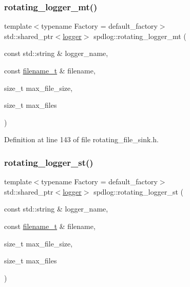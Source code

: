 \subsubsection{\texorpdfstring{rotating\+\_\+logger\+\_\+mt()}{rotating\_logger\_mt()}}
{\footnotesize\ttfamily template$<$typename Factory  = default\+\_\+factory$>$ \\
std\+::shared\+\_\+ptr$<$\hyperlink{classspdlog_1_1logger}{logger}$>$ spdlog\+::rotating\+\_\+logger\+\_\+mt (\begin{DoxyParamCaption}\item[{const std\+::string \&}]{logger\+\_\+name,  }\item[{const \hyperlink{namespacespdlog_acf7ce125b3622e44f8f1702d699e0b06}{filename\+\_\+t} \&}]{filename,  }\item[{size\+\_\+t}]{max\+\_\+file\+\_\+size,  }\item[{size\+\_\+t}]{max\+\_\+files }\end{DoxyParamCaption})\hspace{0.3cm}{\ttfamily [inline]}}



Definition at line 143 of file rotating\+\_\+file\+\_\+sink.\+h.

\mbox{\label{namespacespdlog_aa94a9f4d699643b6cdecf107ec5340d6}} 
\subsubsection{\texorpdfstring{rotating\+\_\+logger\+\_\+st()}{rotating\_logger\_st()}}
{\footnotesize\ttfamily template$<$typename Factory  = default\+\_\+factory$>$ \\
std\+::shared\+\_\+ptr$<$\hyperlink{classspdlog_1_1logger}{logger}$>$ spdlog\+::rotating\+\_\+logger\+\_\+st (\begin{DoxyParamCaption}\item[{const std\+::string \&}]{logger\+\_\+name,  }\item[{const \hyperlink{namespacespdlog_acf7ce125b3622e44f8f1702d699e0b06}{filename\+\_\+t} \&}]{filename,  }\item[{size\+\_\+t}]{max\+\_\+file\+\_\+size,  }\item[{size\+\_\+t}]{max\+\_\+files }\end{DoxyParamCaption})\hspace{0.3cm}{\ttfamily [inline]}}



